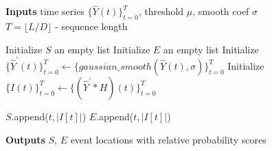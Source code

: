 \documentclass{article}
\begin{document}
\begin{algorithm*}[ht]
\label{seg:m1}
\caption{Traditional Segmentation Post-Processing Procedure (\hyperref[seg:m1]{Method 1})}\label{euclid}
\hspace*{\algorithmicindent} \textbf{Inputs} time series $\{\hat{Y}(t)\}_{t=0}^T$, threshold $\mu$, smooth coef $\sigma$ \\ 
\hspace*{50pt} $T = \lfloor L/D \rfloor$ - sequence length
\begin{algorithmic}[1]
    \State Initialize $S$ an empty list 
    \State Initialize $E$ an empty list 
    \State Initialize $\{\hat{Y}^\prime(t)\}_{t=0}^T \leftarrow \{gaussian\_smooth(\hat{Y}(t),\sigma)\}_{t=0}^T$ 
    \State Initialize $\{I(t)\}_{t=0}^T \leftarrow \{(\hat{Y}^\prime * H)(t)\}_{t=0}^T$ 

            \State $S$.append($t, \mathopen|I[t]\mathclose|$)
            \State $E$.append($t, \mathopen|I[t]\mathclose|$)
        \EndIf
    \EndFor
    \EndProcedure
\end{algorithmic}
\hspace*{\algorithmicindent} \textbf{Outputs} $S$, $E$ event locations with relative probability scores
\end{algorithm*}
\end{document}
